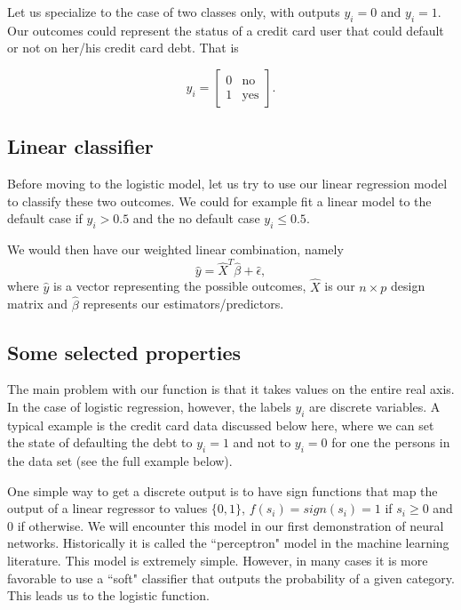 \documentclass[%
oneside,                 %
final,                   %
10pt]{article}
\begin{document}
Let us specialize to the case of two classes only, with outputs
$y_i=0$ and $y_i=1$. Our outcomes could represent the status of a
credit card user that could default or not on her/his credit card
debt. That is


\[
y_i = \begin{bmatrix} 0 & \mathrm{no}\\  1 & \mathrm{yes} \end{bmatrix}.
\]



\subsection*{Linear classifier}

Before moving to the logistic model, let us try to use our linear regression model to classify these two outcomes. We could for example fit a linear model to the default case if $y_i > 0.5$ and the no default case $y_i \leq 0.5$. 

We would then have our 
weighted linear combination, namely 
\begin{equation}
\hat{y} = \hat{X}^T\hat{\beta} +  \hat{\epsilon},
\end{equation}
where $\hat{y}$ is a vector representing the possible outcomes, $\hat{X}$ is our
$n\times p$ design matrix and $\hat{\beta}$ represents our estimators/predictors.

\subsection*{Some selected properties}

The main problem with our  function is that it 
takes values on the entire real axis. In the case of
logistic regression, however, the labels $y_i$ are discrete
variables. A typical example is the credit card data discussed below here, where we can set the state of defaulting the debt to $y_i=1$ and not to $y_i=0$ for one the persons in the data set (see the full example below).

One simple way to get a discrete output is to have sign
functions that map the output of a linear regressor to values $\{0,1\}$,
$f(s_i)=sign(s_i)=1$ if $s_i\ge 0$ and 0 if otherwise. 
We will encounter this model in our first demonstration of neural networks. Historically it is called the ``perceptron" model in the machine learning
literature. This model is extremely simple. However, in many cases it is more
favorable to use a ``soft" classifier that outputs
the probability of a given category. This leads us to the logistic function.
\end{document}
